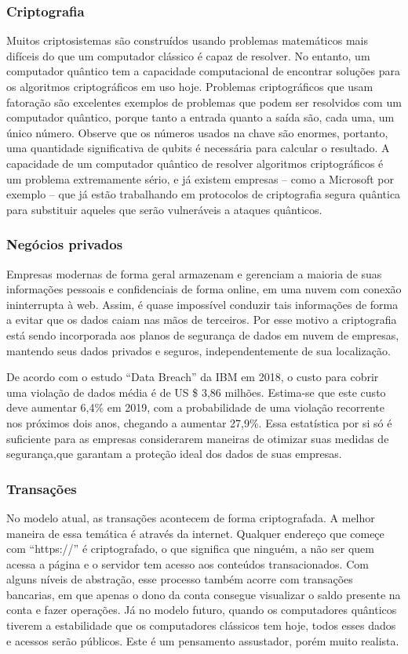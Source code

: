 \subsubsection{Criptografia}
Muitos criptosistemas são construídos usando problemas matemáticos mais difíceis do que um computador clássico é capaz de resolver. No entanto, um computador quântico tem a capacidade computacional de encontrar soluções para os algoritmos criptográficos em uso hoje. Problemas criptográficos que usam fatoração são excelentes exemplos de problemas que podem ser resolvidos com um computador quântico, porque tanto a entrada quanto a saída são, cada uma, um único número. Observe que os números usados na chave são enormes, portanto, uma quantidade significativa de qubits é necessária para calcular o resultado. A capacidade de um computador quântico de resolver algoritmos criptográficos é um problema extremamente sério, e já existem empresas – como a Microsoft por exemplo – que já estão trabalhando em protocolos de criptografia segura quântica para substituir aqueles que serão vulneráveis a ataques quânticos.

\subsubsection{Negócios privados}
Empresas modernas de forma geral armazenam e gerenciam a maioria de suas informações pessoais e confidenciais de forma online, em uma nuvem com conexão ininterrupta à web. Assim, é quase impossível conduzir tais informações de forma a evitar que os dados caiam nas mãos de terceiros. Por  esse motivo a criptografia está sendo incorporada aos planos de segurança de dados em nuvem de empresas, mantendo seus dados privados e seguros, independentemente de sua localização. 

De acordo com o estudo “Data Breach” da IBM em 2018, o custo para cobrir uma violação de dados média é de US \$ 3,86 milhões. Estima-se que este custo deve aumentar 6,4\% em 2019, com a probabilidade de uma violação recorrente nos próximos dois anos, chegando a aumentar 27,9\%. Essa estatística por si só é suficiente para as empresas considerarem maneiras de otimizar suas medidas de segurança,que garantam a proteção ideal dos dados de suas empresas.

\subsubsection{Transações}
No modelo atual, as transações acontecem de forma criptografada. A melhor maneira de essa temática é através da internet. Qualquer endereço que começe com “https://” é criptografado, o que significa que ninguém, a não ser quem acessa a página e o servidor tem acesso aos conteúdos transacionados. Com alguns níveis de abstração, esse processo também acorre com transações bancarias, em que apenas o dono da conta consegue visualizar o saldo presente na conta e fazer operações. Já no modelo futuro, quando os computadores quânticos tiverem a estabilidade que os computadores clássicos tem hoje, todos esses dados e acessos serão públicos. Este é um pensamento assustador, porém muito realista.

